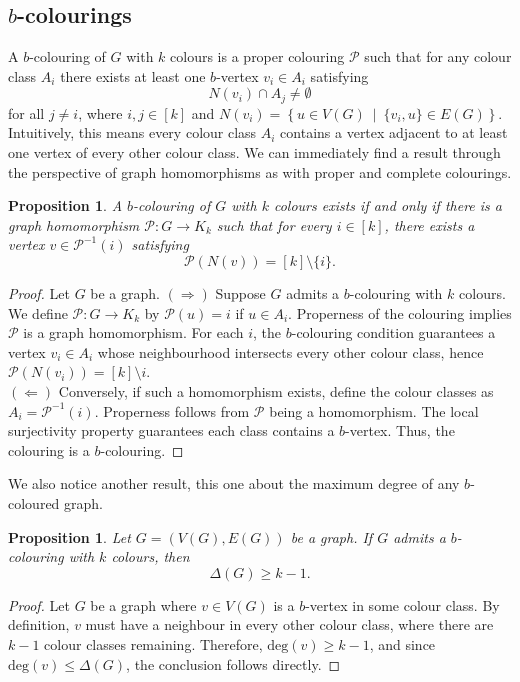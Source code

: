 \documentclass[12pt]{amsart}
\numberwithin{figure}{section}
\theoremstyle{plain}
\newtheorem{proposition}[theorem]{Proposition}
\begin{document}
\subsection{$b$-colourings} A $b$-colouring of $G$ with $k$ colours is a proper colouring $\mathcal{P}$ such that for any colour class $A_{i}$ there exists at least one $b$-vertex $v_{i}\in A_{i}$ satisfying
\[N(v_{i})\cap A_{j} \neq \emptyset\]
for all $j \neq i$, where $i,j\in[k]$ and $N(v_{i}) = \left\{u\in V(G)\:\middle|\:\{v_{i}, u\}\in E(G)\right\}$. Intuitively, this means every colour class $A_{i}$ contains a vertex adjacent to at least one vertex of every other colour class. We can immediately find a result through the perspective of graph homomorphisms as with proper and complete colourings.
\begin{proposition}
    A $b$-colouring of $G$ with $k$ colours exists if and only if there is a graph homomorphism $\mathcal{P}: G \to K_{k}$ such that for every $i \in [k]$, there exists a vertex $v \in \mathcal{P}^{-1}(i)$ satisfying
    \[\mathcal{P}(N(v))=[k]\setminus\{i\}.\]
\end{proposition}
\begin{proof}
    Let $G$ be a graph. $(\Rightarrow)$ Suppose $G$ admits a $b$-colouring with $k$ colours. We define $\mathcal{P}: G \to K_{k}$ by $\mathcal{P}(u) = i$ if $u \in A_{i}$. Properness of the colouring implies $\mathcal{P}$ is a graph homomorphism. For each $i$, the $b$-colouring condition guarantees a vertex $v_{i} \in A_{i}$ whose neighbourhood intersects every other colour class, hence $\mathcal{P}(N(v_{i})) = [k]\setminus{i}$.\\
    \indent $(\Leftarrow)$ Conversely, if such a homomorphism exists, define the colour classes as $A_{i} = \mathcal{P}^{-1}(i)$. Properness follows from $\mathcal{P}$ being a homomorphism. The local surjectivity property guarantees each class contains a $b$-vertex. Thus, the colouring is a $b$-colouring.
\end{proof}
\indent We also notice another result, this one about the maximum degree of any $b$-coloured graph.
\begin{proposition}
    Let $G=(V(G), E(G))$ be a graph. If $G$ admits a $b$-colouring with $k$ colours, then
    \[\Delta(G) \geq k-1.\]
\end{proposition}
\begin{proof}
    Let $G$ be a graph where $v\in V(G)$ is a $b$-vertex in some colour class. By definition, $v$ must have a neighbour in every other colour class, where there are $k-1$ colour classes remaining. Therefore, $\mathrm{deg}(v) \geq k-1$, and since $\mathrm{deg}(v)\leq\Delta(G)$, the conclusion follows directly.
\end{proof}
\end{document}
